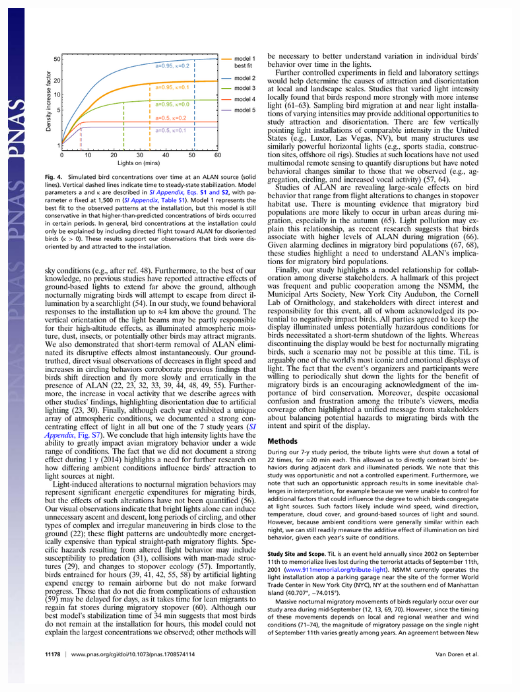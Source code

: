 \documentclass[a4paper, twoside]{templates/ociamthesis}
\begin{document}
\begin{center}\includegraphics[width=1\linewidth]{pdf_chapters/lights/lights_crop_Part4} \end{center}
\end{document}
